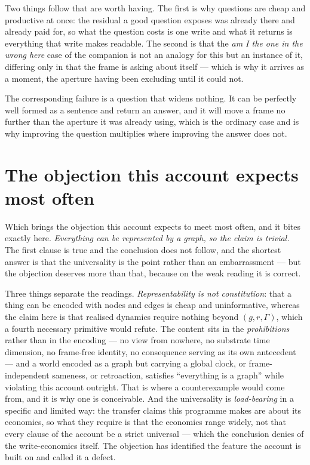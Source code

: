 \documentclass[11pt,a4paper]{article}
\theoremstyle{remark}\newtheorem{remark}[definition]{Remark}
\begin{document}
Two things follow that are worth having. The first is why questions are cheap and productive at once:
the residual a good question exposes was already there and already paid for, so what the question costs
is one write and what it returns is everything that write makes readable. The second is that the
\emph{am I the one in the wrong here} case of the companion is not an analogy for this but an instance
of it, differing only in that the frame is asking about itself --- which is why it arrives as a moment,
the aperture having been excluding until it could not.

The corresponding failure is a question that widens nothing. It can be perfectly well formed as a
sentence and return an answer, and it will move a frame no further than the aperture it was already
using, which is the ordinary case and is why improving the question multiplies where improving the
answer does not.

\section{The objection this account expects most often}\label{sec:objection}

Which brings the objection this account expects to meet most often, and it bites exactly here.
\emph{Everything can be represented by a graph, so the claim is trivial.} The first clause is true and
the conclusion does not follow, and the shortest answer is that the universality is the point rather
than an embarrassment --- but the objection deserves more than that, because on the weak reading it is
correct.

Three things separate the readings. \emph{Representability is not constitution}: that a thing can be
encoded with nodes and edges is cheap and uninformative, whereas the claim here is that realised
dynamics require nothing beyond $(g,r,\Gamma)$, which a fourth necessary primitive would refute. The
content sits in the \emph{prohibitions} rather than in the encoding --- no view from nowhere, no
substrate time dimension, no frame-free identity, no consequence serving as its own antecedent --- and a world encoded as a graph but carrying a global clock, or
frame-independent sameness, or retroaction, satisfies ``everything is a graph'' while violating this
account outright. That is where a counterexample would come from, and it is why one is conceivable.
And the universality is \emph{load-bearing} in a specific and limited way: the transfer claims this
programme makes are about its economics, so what they require is that the economics range widely, not
that every clause of the account be a strict universal --- which the conclusion denies of the
write-economics itself. The objection has identified the feature the account is built on and called it a defect.
\end{document}
